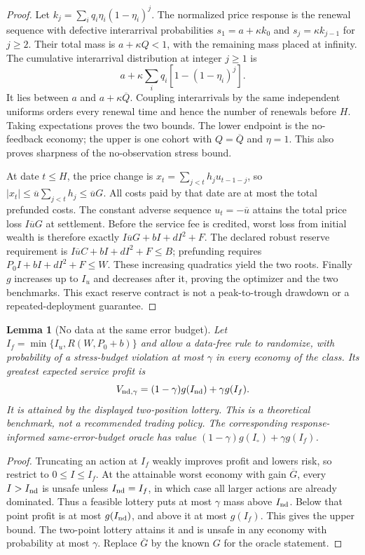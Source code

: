 \documentclass[12pt]{article}
\newtheorem{lemma}[theorem]{Lemma}
\theoremstyle{definition}
\theoremstyle{remark}
\begin{document}
\begin{proof}
Let $k_j=\sum_iq_i\eta_i(1-\eta_i)^j$. The normalized price response is
the renewal sequence with defective interarrival probabilities
$s_1=a+\kappa k_0$ and $s_j=\kappa k_{j-1}$ for $j\ge2$.
Their total mass is $a+\kappa Q<1$, with the remaining mass placed at
infinity. The cumulative interarrival distribution at integer $j\ge1$ is
\[
 a+\kappa\sum_iq_i[1-(1-\eta_i)^j].
\]
It lies between $a$ and $a+\kappa\overline Q$. Coupling interarrivals by
the same independent uniforms orders every renewal time and hence the
number of renewals before $H$. Taking expectations proves the two bounds.
The lower endpoint is the no-feedback economy; the upper is one cohort
with $Q=\overline Q$ and $\eta=1$. This also proves sharpness of the
no-observation stress bound.

At date $t\le H$, the price change is
$x_t=\sum_{j<t}h_j u_{t-1-j}$, so
$|x_t|\le\overline u\sum_{j<t}h_j\le\overline uG$.
All costs paid by that date are at most the total prefunded costs.
The constant adverse sequence $u_t=-\overline u$ attains the total price
loss $I\overline uG$ at settlement. Before the service fee is credited,
worst loss from initial wealth is therefore exactly
$I\overline uG+bI+dI^2+F$. The declared robust reserve requirement is
$I\overline uC+bI+dI^2+F\le B$; prefunding requires
$P_0I+bI+dI^2+F\le W$. These increasing quadratics yield the two roots.
Finally $g$ increases up to $I_u$ and decreases after it, proving the
optimizer and the two benchmarks. This exact reserve contract is not a
peak-to-trough drawdown or a repeated-deployment guarantee.
\end{proof}

\begin{lemma}[No data at the same error budget]\label{fhc:nodata-chance}
Let $I_f=\min\{I_u,R(W,P_0+b)\}$ and allow a data-free rule to randomize,
with probability of a stress-budget violation at most $\gamma$ in every
economy of the class. Its greatest expected service profit is
\[
 V_{{\rm nd},\gamma}=(1-\gamma)g(I_{\rm nd})+\gamma g(I_f).
\]
It is attained by the displayed two-position lottery. This is a theoretical
benchmark, not a recommended trading policy. The corresponding response-
informed same-error-budget oracle has value
$(1-\gamma)g(I_\circ)+\gamma g(I_f)$.
\end{lemma}

\begin{proof}
Truncating an action at $I_f$ weakly improves profit and lowers risk, so
restrict to $0\le I\le I_f$. At the attainable worst economy with gain
$\overline G$, every $I>I_{\rm nd}$ is unsafe unless $I_{\rm nd}=I_f$,
in which case all larger actions are already dominated. Thus a feasible
lottery puts at most $\gamma$ mass above $I_{\rm nd}$. Below that point
profit is at most $g(I_{\rm nd})$, and above it at most $g(I_f)$.
This gives the upper bound. The two-point lottery attains it and is unsafe
in any economy with probability at most $\gamma$. Replace $\overline G$
by the known $G$ for the oracle statement.
\end{proof}
\end{document}
